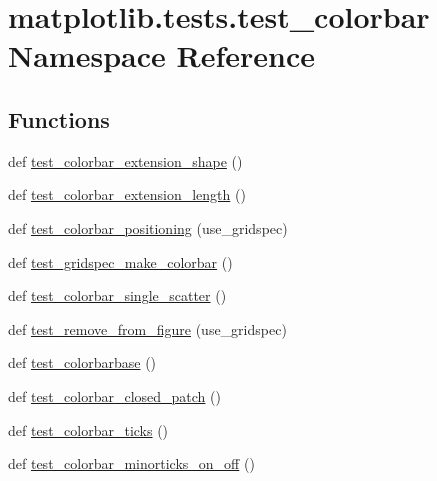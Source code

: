 \hypertarget{namespacematplotlib_1_1tests_1_1test__colorbar}{}\section{matplotlib.\+tests.\+test\+\_\+colorbar Namespace Reference}
\label{namespacematplotlib_1_1tests_1_1test__colorbar}
\subsection*{Functions}
\begin{DoxyCompactItemize}
\item 
def \hyperlink{namespacematplotlib_1_1tests_1_1test__colorbar_a8f08c5f95c0d8731972827dd2c75ae94}{test\+\_\+colorbar\+\_\+extension\+\_\+shape} ()
\item 
def \hyperlink{namespacematplotlib_1_1tests_1_1test__colorbar_aa1296cc2d8d6a6e2da1a5a0631eea65b}{test\+\_\+colorbar\+\_\+extension\+\_\+length} ()
\item 
def \hyperlink{namespacematplotlib_1_1tests_1_1test__colorbar_a2c24afe5271b96979116aa28ac5988ee}{test\+\_\+colorbar\+\_\+positioning} (use\+\_\+gridspec)
\item 
def \hyperlink{namespacematplotlib_1_1tests_1_1test__colorbar_a292ead10d4fc9dccd67fcc9a0ae573e7}{test\+\_\+gridspec\+\_\+make\+\_\+colorbar} ()
\item 
def \hyperlink{namespacematplotlib_1_1tests_1_1test__colorbar_a01deeeb81ec6b76c879dc48f9ad3d1d2}{test\+\_\+colorbar\+\_\+single\+\_\+scatter} ()
\item 
def \hyperlink{namespacematplotlib_1_1tests_1_1test__colorbar_abce1fd1593710708a5d7e5c30092de07}{test\+\_\+remove\+\_\+from\+\_\+figure} (use\+\_\+gridspec)
\item 
def \hyperlink{namespacematplotlib_1_1tests_1_1test__colorbar_a863aec05da71c6abd103ed8a79a8b463}{test\+\_\+colorbarbase} ()
\item 
def \hyperlink{namespacematplotlib_1_1tests_1_1test__colorbar_a985dd6ce1f37e5556a4bbb1ee958e342}{test\+\_\+colorbar\+\_\+closed\+\_\+patch} ()
\item 
def \hyperlink{namespacematplotlib_1_1tests_1_1test__colorbar_a466dbe42ab425c04190124d5312de7d3}{test\+\_\+colorbar\+\_\+ticks} ()
\item 
def \hyperlink{namespacematplotlib_1_1tests_1_1test__colorbar_a187d7117720cedaacff86a946d475cb2}{test\+\_\+colorbar\+\_\+minorticks\+\_\+on\+\_\+off} ()

\end{DoxyCompactItemize}
